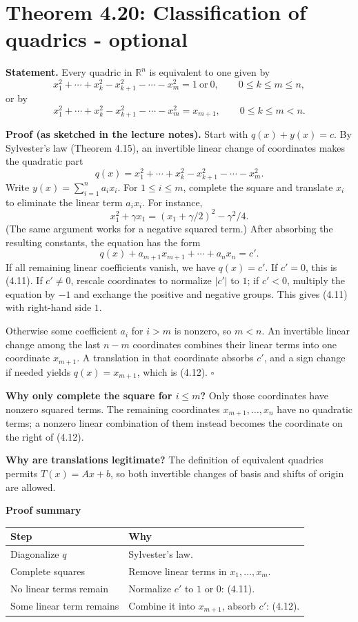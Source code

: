\documentclass[11pt,a4paper]{article}
\newcommand{\prooftable}[1]{\medskip\textbf{Proof summary}\par\smallskip #1\medskip}
\begin{document}
\section{Theorem 4.20: Classification of quadrics - optional}
\textbf{Statement.} Every quadric in \(\mathbb R^n\) is equivalent to
one given by
\[
x_1^2+\cdots+x_k^2-x_{k+1}^2-\cdots-x_m^2=1\ \text{or}\ 0,
\qquad 0\leq k\leq m\leq n, \tag{4.11}
\]
or by
\[
x_1^2+\cdots+x_k^2-x_{k+1}^2-\cdots-x_m^2=x_{m+1},
\qquad 0\leq k\leq m<n. \tag{4.12}
\]

\textbf{Proof (as sketched in the lecture notes).}
Start with \(q(x)+y(x)=c\).
By Sylvester's law (Theorem 4.15), an invertible linear change of
coordinates makes the quadratic part
\[
q(x)=x_1^2+\cdots+x_k^2-x_{k+1}^2-\cdots-x_m^2.
\]
Write \(y(x)=\sum_{i=1}^n a_ix_i\).
For \(1\leq i\leq m\), complete the square and translate \(x_i\)
to eliminate the linear term \(a_ix_i\).
For instance,
\[
x_1^2+\gamma x_1=(x_1+\gamma/2)^2-\gamma^2/4.
\]
(The same argument works for a negative squared term.)
After absorbing the resulting constants, the equation has the form
\[
q(x)+a_{m+1}x_{m+1}+\cdots+a_nx_n=c'.
\]
If all remaining linear coefficients vanish, we have \(q(x)=c'\).
If \(c'=0\), this is (4.11). If \(c'\neq0\), rescale coordinates
to normalize \(|c'|\) to \(1\); if \(c'<0\), multiply the equation
by \(-1\) and exchange the positive and negative groups.
This gives (4.11) with right-hand side \(1\).

Otherwise some coefficient \(a_i\) for \(i>m\) is nonzero, so \(m<n\).
An invertible linear change among the last \(n-m\) coordinates
combines their linear terms into one coordinate \(x_{m+1}\).
A translation in that coordinate absorbs \(c'\), and a sign change
if needed yields \(q(x)=x_{m+1}\), which is (4.12). \(\square\)

\begin{personalnote}
\textbf{Why only complete the square for \(i\leq m\)?}
Only those coordinates have nonzero squared terms.
The remaining coordinates \(x_{m+1},\ldots,x_n\) have no quadratic terms;
a nonzero linear combination of them instead becomes the coordinate
on the right of (4.12).

\textbf{Why are translations legitimate?}
The definition of equivalent quadrics permits \(T(x)=Ax+b\),
so both invertible changes of basis and shifts of origin are allowed.
\end{personalnote}
\prooftable{\begin{tabularx}{\linewidth}{@{}p{.29\linewidth}X@{}}\hline
Step & Why\\\hline
Diagonalize \(q\) & Sylvester's law.\\
Complete squares & Remove linear terms in \(x_1,\ldots,x_m\).\\
No linear terms remain & Normalize \(c'\) to \(1\) or \(0\): (4.11).\\
Some linear term remains & Combine it into \(x_{m+1}\), absorb \(c'\): (4.12).\\\hline
\end{tabularx}}
\end{document}
